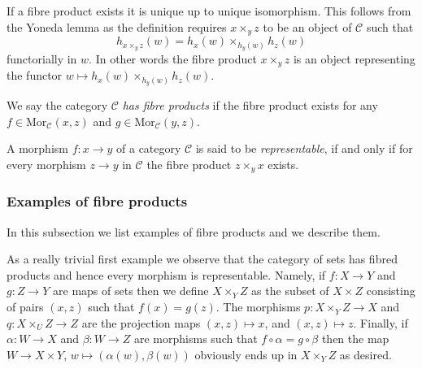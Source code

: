 \noindent
If a fibre product exists it is unique up to unique
isomorphism. This follows from the Yoneda lemma as
the definition requires $x\times_yz$ to be an object
of $\mathcal{C}$ such that
$$
h_{x\times_y z}(w) = h_x(w) \times_{h_y(w)} h_z(w)
$$
functorially in $w$. In other words the fibre product $x\times_yz$
is an object representing the functor
$w \mapsto h_x(w) \times_{h_y(w)} h_z(w)$.

\begin{definition}
\label{definition-has-fibre-products}
We say the category $\mathcal{C}$ {\it has fibre products} if
the fibre product exists for any $f\in \text{Mor}_{\mathcal C}(x,z)$
and $g\in \text{Mor}_{\mathcal C}(y,z)$.
\end{definition}

\begin{definition}
\label{definition-representable-morphism}
A morphism $f : x \to y$ of a category $\mathcal{C}$ is said to be
{\it representable}, if and only if for every morphism $z \to y$
in $\mathcal{C}$ the fibre product $z\times_y x$ exists.
\end{definition}

\subsubsection{Examples of fibre products}
\label{subsubsection-example-fibre-products}

\noindent
In this subsection we list examples of fibre products and
we describe them.

\medskip\noindent 
As a really trivial first example we observe 
that the category of sets has fibred products and hence every
morphism is representable. Namely, if $f : X \to Y$
and $g : Z \to Y$ are maps of sets then we define
$X\times_Y Z$ as the subset of $X\times Z$ consisting
of pairs $(x,z)$ such that $f(x) = g(z)$. The morphisms
$p : X\times_Y Z \to X$ and $q : X\times_U Z \to Z$ are
the projection maps $(x,z) \mapsto x$, and $(x,z) \mapsto z$.
Finally, if $\alpha : W \to X$ and $\beta : W \to Z$ 
are morphisms such that $f \circ \alpha = g \circ \beta$
then the map $W \to X\times Y$, $w\mapsto (\alpha(w), \beta(w))$
obviously ends up in $X\times_YZ$ as desired.

